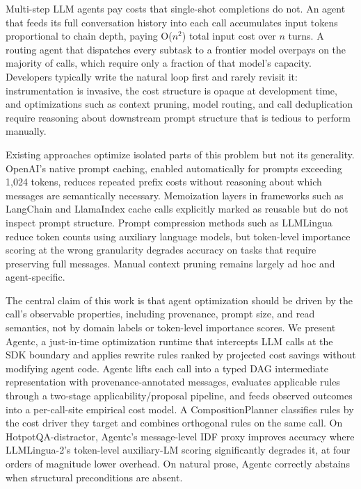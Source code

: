 \documentclass[sigconf,9pt]{acmart}
\begin{document}
Multi-step LLM agents pay costs that single-shot completions do not. An agent that
feeds its full conversation history into each call accumulates input tokens
proportional to chain depth, paying O($n^2$) total input cost over $n$ turns. A
routing agent that dispatches every subtask to a frontier model overpays on the
majority of calls, which require only a fraction of that model's capacity. Developers
typically write the natural loop first and rarely revisit it: instrumentation is
invasive, the cost structure is opaque at development time, and optimizations such as
context pruning, model routing, and call deduplication require reasoning about
downstream prompt structure that is tedious to perform manually.

Existing approaches optimize isolated parts of this problem but not its generality.
OpenAI's native prompt caching, enabled automatically for prompts exceeding 1,024
tokens, reduces repeated prefix costs without reasoning about which messages are
semantically necessary. Memoization layers in frameworks such as LangChain and
LlamaIndex cache calls explicitly marked as reusable but do not inspect prompt
structure. Prompt compression methods such as LLMLingua~\cite{jiang2023llmlingua}
reduce token counts using auxiliary language models, but token-level importance
scoring at the wrong granularity degrades accuracy on tasks that require preserving
full messages. Manual context pruning remains largely ad hoc and agent-specific.

The central claim of this work is that agent optimization should be driven by
the call's observable properties, including provenance, prompt size, and read
semantics, not by domain labels or token-level importance scores. We present Agentc, a
just-in-time optimization runtime that intercepts LLM calls at the SDK boundary and
applies rewrite rules ranked by projected cost savings without modifying agent code.
Agentc lifts each call into a typed DAG intermediate representation with
provenance-annotated messages, evaluates applicable rules through a two-stage
applicability/proposal pipeline, and feeds observed outcomes into a per-call-site
empirical cost model. A CompositionPlanner classifies rules by the cost driver they
target and combines orthogonal rules on the same call. On HotpotQA-distractor, Agentc's
message-level IDF proxy improves accuracy where LLMLingua-2's token-level auxiliary-LM
scoring significantly degrades it, at four orders of magnitude lower overhead. On
natural prose, Agentc correctly abstains when structural preconditions are absent.
\end{document}
